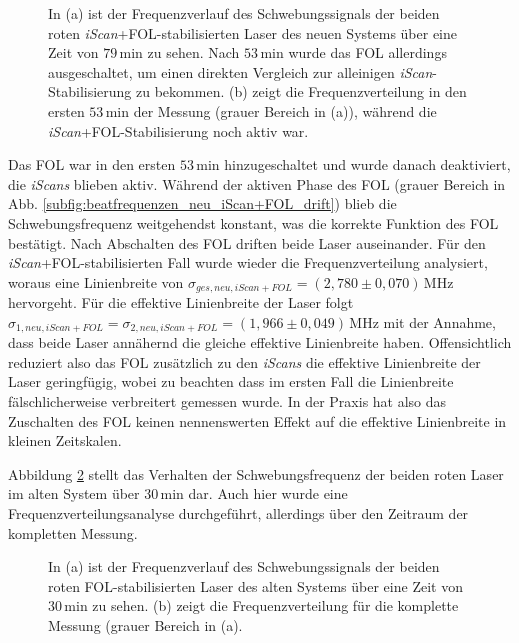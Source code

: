 \begin{figure}[hp]
 	\centering
 	\footnotesize
 	\fbox{\parbox{\dimexpr \linewidth - 2\fboxrule - 2\fboxsep}{
 	\subfigure[]{
		\label{subfig:beatfrequenzen_neu_iScan+FOL_drift}
		
		}
 	\subfigure[]{
		\label{subfig:beatfrequenzen_neu_iScan+FOL_histogramm}
		
		}
	}}
	\caption[Beatfrequenzen - neues System mit \textit{iScan}+FOL]{In (a) ist der
	Frequenzverlauf des Schwebungssignals der beiden roten
	\textit{iScan}+FOL-stabilisierten Laser des neuen Systems über eine Zeit von
	$79\,$min zu sehen. Nach $53\,$min wurde das FOL allerdings ausgeschaltet, um
	einen direkten Vergleich zur alleinigen \textit{iScan}-Stabilisierung zu
	bekommen. (b) zeigt die Frequenzverteilung in den ersten $53\,$min der Messung
	(grauer Bereich in (a)), während die \textit{iScan}+FOL-Stabilisierung noch
	aktiv war.}
	\label{fig:beatfrequenzen_neu_iScan+FOL}
\end{figure}
Das FOL war in den ersten $53\,$min hinzugeschaltet und wurde danach
deaktiviert, die \textit{iScans} blieben aktiv. Während der aktiven Phase des
FOL (grauer Bereich in Abb.
\ref{subfig:beatfrequenzen_neu_iScan+FOL_drift}) blieb die Schwebungsfrequenz
weitgehendst konstant, was die korrekte Funktion des FOL bestätigt. Nach
Abschalten des FOL driften beide Laser auseinander. Für den
\textit{iScan}+FOL-stabilisierten Fall wurde wieder die Frequenzverteilung
analysiert, woraus eine Linienbreite von
$\sigma_{ges,neu,iScan+FOL}=(2,780\pm0,070)\,$MHz hervorgeht. Für die effektive
Linienbreite der Laser folgt
$\sigma_{1,neu,iScan+FOL}=\sigma_{2,neu,iScan+FOL}=(1,966\pm0,049)\,$MHz mit der
Annahme, dass beide Laser annähernd die gleiche effektive Linienbreite haben.
Offensichtlich reduziert also das FOL zusätzlich zu den \textit{iScans} die
effektive Linienbreite der Laser geringfügig, wobei zu beachten dass im ersten
Fall die Linienbreite fälschlicherweise verbreitert gemessen wurde. In der
Praxis hat also das Zuschalten des FOL keinen nennenswerten Effekt auf die
effektive Linienbreite in kleinen Zeitskalen.\par
Abbildung \ref{fig:beatfrequenzen_alt_FOL} stellt das Verhalten der
Schwebungsfrequenz der beiden roten Laser im alten System über $30\,$min dar.
Auch hier wurde eine Frequenzverteilungsanalyse durchgeführt, allerdings über
den Zeitraum der kompletten Messung.
\begin{figure}[hp]
 	\centering
 	\footnotesize
 	\fbox{\parbox{\dimexpr \linewidth - 2\fboxrule - 2\fboxsep}{
 	\subfigure[]{
		\label{subfig:beatfrequenzen_alt_FOL_drift}
		
		}
 	\subfigure[]{
		\label{subfig:beatfrequenzen_alt_FOL_histogramm}
		
		}
	}}
	\caption[Beatfrequenzen - altes System mit FOL]{In (a) ist der
	Frequenzverlauf des Schwebungssignals der beiden roten
	FOL-stabilisierten Laser des alten Systems über eine Zeit von
	$30\,$min zu sehen. (b) zeigt die Frequenzverteilung für die komplette Messung
	(grauer Bereich in (a).}
	\label{fig:beatfrequenzen_alt_FOL}
\end{figure}
